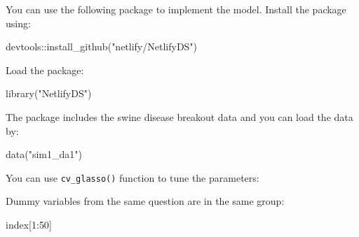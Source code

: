 \documentclass[
  12pt,
]{krantz}
\makeatletter
\newenvironment{Shaded}{\begin{snugshade}}{\end{snugshade}}
\newcommand{\CommentTok}[1]{\textcolor[rgb]{0.37,0.37,0.37}{\textit{#1}}}
\newcommand{\DecValTok}[1]{\textcolor[rgb]{0.06,0.06,0.06}{#1}}
\newcommand{\FunctionTok}[1]{\textcolor[rgb]{0,0,0}{#1}}
\newcommand{\NormalTok}[1]{#1}
\newcommand{\OtherTok}[1]{\textcolor[rgb]{0.37,0.37,0.37}{#1}}
\newcommand{\SpecialCharTok}[1]{\textcolor[rgb]{0,0,0}{#1}}
\newcommand{\StringTok}[1]{\textcolor[rgb]{0.5,0.5,0.5}{#1}}
\newenvironment{kframe}{%
\medskip{}
\setlength{\fboxsep}{.8em}
 \def\at@end@of@kframe{}%
 \ifinner\ifhmode%
  \def\at@end@of@kframe{\end{minipage}}%
  \begin{minipage}{\columnwidth}%
 \fi\fi%
 \def\FrameCommand##1{\hskip\@totalleftmargin \hskip-\fboxsep
 \colorbox{shadecolor}{##1}\hskip-\fboxsep
     \hskip-\linewidth \hskip-\@totalleftmargin \hskip\columnwidth}%
 \MakeFramed {\advance\hsize-\width
   \@totalleftmargin\z@ \linewidth\hsize
   \@setminipage}}%
 {\par\unskip\endMakeFramed%
 \at@end@of@kframe}
\renewenvironment{Shaded}{\begin{kframe}}{\end{kframe}}
\makeatother
\begin{document}
You can use the following package to implement the model. Install the package using:

\begin{Shaded}
\begin{Highlighting}[]
\NormalTok{devtools}\SpecialCharTok{::}\FunctionTok{install\_github}\NormalTok{(}\StringTok{"netlify/NetlifyDS"}\NormalTok{)}
\end{Highlighting}
\end{Shaded}

Load the package:

\begin{Shaded}
\begin{Highlighting}[]
\FunctionTok{library}\NormalTok{(}\StringTok{"NetlifyDS"}\NormalTok{)}
\end{Highlighting}
\end{Shaded}

The package includes the swine disease breakout data and you can load the data by:

\begin{Shaded}
\begin{Highlighting}[]
\FunctionTok{data}\NormalTok{(}\StringTok{"sim1\_da1"}\NormalTok{)}
\end{Highlighting}
\end{Shaded}

You can use \texttt{cv\_glasso()} function to tune the parameters:

\begin{Shaded}
\end{Shaded}

Dummy variables from the same question are in the same group:

\begin{Shaded}
\begin{Highlighting}[]
\NormalTok{index[}\DecValTok{1}\SpecialCharTok{:}\DecValTok{50}\NormalTok{]}
\end{Highlighting}
\end{Shaded}
\end{document}
